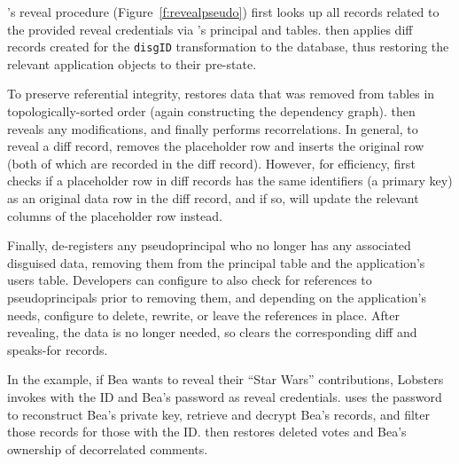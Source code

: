 \sys's reveal procedure (Figure~\ref{f:revealpseudo}) first looks up all \xx
records related to the provided reveal credentials via \sys's principal and \xx
tables.
%
\sys then applies diff records created for the \verb+disgID+ \xx transformation
to the database, thus restoring the relevant
application objects to their pre-\xxed state.

%
To preserve referential integrity, \sys restores
\xxed data that was removed from tables in topologically-sorted order (again
constructing the dependency graph).
%
\sys then reveals any modifications, and finally performs recorrelations. 
%
In general, to reveal a diff record, \sys removes the placeholder row
and inserts the original row (both of which are recorded in the diff record).
%
However, for efficiency, \sys first checks if a placeholder row in diff records
has the same identifiers (\eg a primary key) as an original data row in the diff
record, and if so, will update the relevant columns of the placeholder row instead.
%

%
Finally, \sys de-registers any pseudoprincipal who no longer has any associated
disguised data, removing them from the principal table and the application's
users table.
%
Developers can configure \sys to also check for references to pseudoprincipals
prior to removing them, and depending on the application's needs, configure \sys
to delete, rewrite, or leave the references in place.
%
After revealing, the \xxed data is no longer needed, so \sys clears the
corresponding diff and speaks-for records.
%

%
In the example, if Bea wants to reveal their ``Star Wars'' contributions,
Lobsters invokes \sys with the \xx ID and Bea's password as reveal credentials.
%
\sys uses the password to reconstruct Bea's private key, retrieve and decrypt
Bea's records, and filter those records for those with the \xx ID.
%
\sys then restores deleted votes and Bea's ownership of
decorrelated comments.
%

